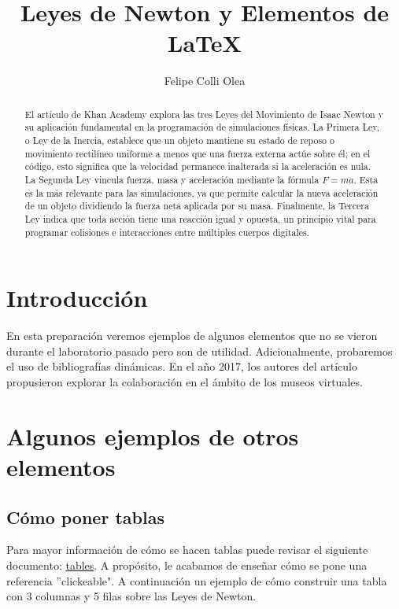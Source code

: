 \documentclass{article}
\title{Leyes de Newton y Elementos de \LaTeX}
\author{Felipe Colli Olea}
\begin{document}
\maketitle
\thispagestyle{fancy}

\tableofcontents
\vspace{3cm}
\begin{abstract}
	El artículo de Khan Academy explora las tres Leyes del Movimiento de Isaac Newton y su aplicación fundamental en la programación de simulaciones físicas. La Primera Ley, o Ley de la Inercia, establece que un objeto mantiene su estado de reposo o movimiento rectilíneo uniforme a menos que una fuerza externa actúe sobre él; en el código, esto significa que la velocidad permanece inalterada si la aceleración es nula. La Segunda Ley vincula fuerza, masa y aceleración mediante la fórmula $F=ma$. Esta es la más relevante para las simulaciones, ya que permite calcular la nueva aceleración de un objeto dividiendo la fuerza neta aplicada por su masa. Finalmente, la Tercera Ley indica que toda acción tiene una reacción igual y opuesta, un principio vital para programar colisiones e interacciones entre múltiples cuerpos digitales.
\end{abstract}
\newpage

\section{Introducción}

En esta preparación veremos ejemplos de algunos elementos que no se vieron durante el laboratorio pasado pero son de utilidad. Adicionalmente, probaremos el uso de bibliografías dinámicas. En el año 2017, los autores del artículo \cite{virtual} propusieron explorar la colaboración en el ámbito de los museos virtuales.

\section{Algunos ejemplos de otros elementos}

\subsection{Cómo poner tablas}

Para mayor información de cómo se hacen tablas puede revisar el siguiente documento: \href{https://www.overleaf.com/learn/latex/tables}{tables}. A propósito, le acabamos de enseñar cómo se pone una referencia ''clickeable". A continuación un ejemplo de cómo construir una tabla con 3 columnas y 5 filas sobre las Leyes de Newton.
\end{document}
